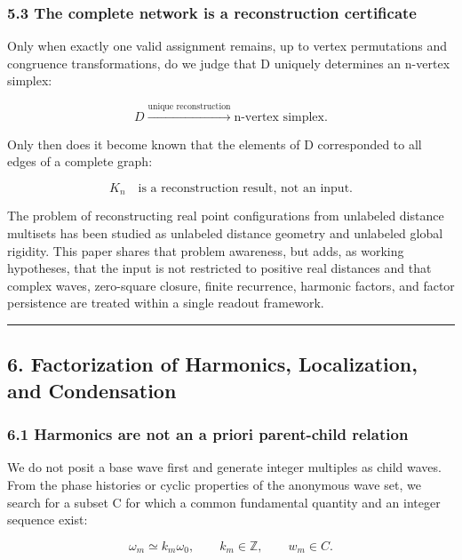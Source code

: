 \documentclass[
  a4paper,
]{article}
\begin{document}
\subsubsection{5.3 The complete network is a reconstruction
certificate}\label{the-complete-network-is-a-reconstruction-certificate}

Only when exactly one valid assignment remains, up to vertex
permutations and congruence transformations, do we judge that D uniquely
determines an n-vertex simplex:

\[
D
\xrightarrow{\text{unique reconstruction}}
\text{n-vertex simplex}.
\]

Only then does it become known that the elements of D corresponded to
all edges of a complete graph:

\[
K_n
\quad\text{is a reconstruction result, not an input}.
\]

The problem of reconstructing real point configurations from unlabeled
distance multisets has been studied as unlabeled distance geometry and
unlabeled global rigidity. This paper shares that problem awareness, but
adds, as working hypotheses, that the input is not restricted to
positive real distances and that complex waves, zero-square closure,
finite recurrence, harmonic factors, and factor persistence are treated
within a single readout framework.

\begin{center}\rule{0.5\linewidth}{0.5pt}\end{center}

\subsection{6. Factorization of Harmonics, Localization, and
Condensation}\label{factorization-of-harmonics-localization-and-condensation}

\subsubsection{6.1 Harmonics are not an a priori parent-child
relation}\label{harmonics-are-not-an-a-priori-parent-child-relation}

We do not posit a base wave first and generate integer multiples as
child waves. From the phase histories or cyclic properties of the
anonymous wave set, we search for a subset C for which a common
fundamental quantity and an integer sequence exist:

\[
\omega_m
\simeq
k_m\omega_0,
\qquad
k_m\in\mathbb Z,
\qquad
w_m\in C.
\]
\end{document}
